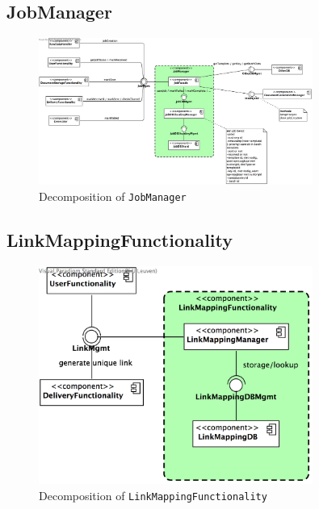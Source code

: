 \documentclass[a4paper,10pt]{article}
\begin{document}
\subsection{JobManager}\label{subsec:decomp-JobManager}
\begin{figure}[!htp]
	\centering
	\includegraphics[width=0.8\textwidth]{JobManager.png}
	\caption{Decomposition of \texttt{JobManager}}
	\label{fig:decomp-JobManager}
\end{figure}
\FloatBarrier

\subsection{LinkMappingFunctionality}\label{subsec:decomp-LinkMappingFunctionality}
\begin{figure}[!htp]
	\centering
	\includegraphics[width=0.8\textwidth]{LinkMappingFunctionality.png}
	\caption{Decomposition of \texttt{LinkMappingFunctionality}}
	\label{fig:decomp-LinkMappingFunctionality}
\end{figure}
\FloatBarrier
\end{document}

